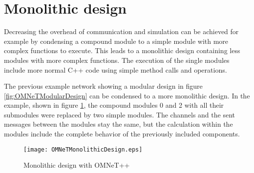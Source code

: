 \section{Monolithic design}
\label{sec:design_monolithic}
Decreasing the overhead of communication and simulation can be achieved for example by condensing a compound module to a simple module with more complex functions to execute.
This leads to a monolithic design containing less modules with more complex functions.
The execution of the single modules include more normal C++ code using simple method calls and operations.

The previous example network showing a modular design in figure \ref{fig:OMNeTModularDesign} can be condensed to a more monolithic design.
In the example, shown in figure \ref{fig:OMNeTMonolithicDesign}, the compound modules 0 and 2 with all their submodules were replaced by two simple modules.
The channels and the sent messages between the modules stay the same, but the calculation within the modules include the complete behavior of the previously included components.

\begin{figure}
    \centering
    \texttt{[image: OMNeTMonolithicDesign.eps]}
    \caption{Monolithic design with OMNeT++}
    \label{fig:OMNeTMonolithicDesign}
\end{figure}

